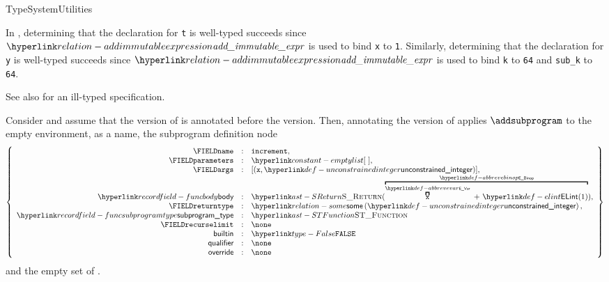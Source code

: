 \begin{TypingRuleList}{TypeSystemUtilities}


In , determining that the declaration for \verb|t|
is well-typed succeeds since $\addimmutableexpression$ is used to bind \verb|x| to \verb|1|.
Similarly, determining that the declaration for \verb|y|
is well-typed succeeds since $\addimmutableexpression$ is used to bind \verb|k| to \verb|64|
and \verb|sub_k| to \verb|64|.

See also  for an ill-typed
specification.




Consider 
and assume that the \integertypeterm{} version of \increment{} is annotated
before the \realtypeterm{} version.
Then, annotating the \integertypeterm{} version of \increment{} applies
$\addsubprogram$ to the empty environment, \increment{} as a name,
the subprogram definition node
\[
\left\{
\begin{array}{rcl}
\FIELDname &:& \increment, \\
\FIELDparameters &:& \emptylist,\\
\FIELDargs &:& [(\vx, \unconstrainedinteger)],\\
\funcbody &:& \SReturn(\AbbrevEBinop{+}{\AbbrevEVar{\vx}}{\ELInt{1}}),\\
\FIELDreturntype &:& \some{\unconstrainedinteger},\\
\funcsubprogramtype &:& \STFunction\\
\FIELDrecurselimit    &:& \none\\
\funcbuiltin &:& \False\\
\funcqualifierfield &:& \none\\
\funcoverride &:& \none\\
\end{array}
\right\}
\]
and the empty set of \sideeffectdescriptorsterm.


\end{TypingRuleList}
